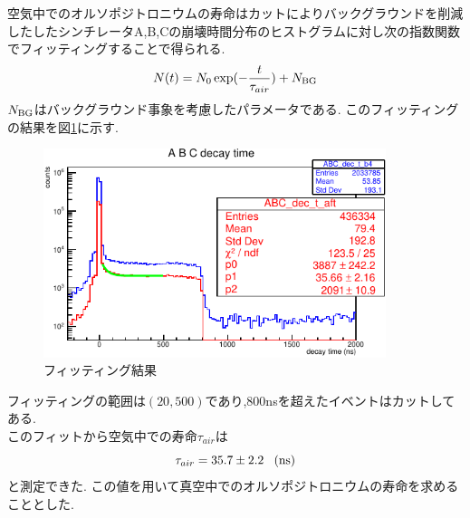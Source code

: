空気中でのオルソポジトロニウムの寿命はカットによりバックグラウンドを削減したしたシンチレータA,B,Cの崩壊時間分布のヒストグラムに対し次の指数関数でフィッティングすることで得られる.\\
\begin{equation}
N(t)=N_0\exp(-\frac{t}{\tau_{air}})+N_{\rm BG}
\end{equation}
$N_{\rm BG}$はバックグラウンド事象を考慮したパラメータである.
このフィッティングの結果を図\ref{fig:life_in_air}に示す.
\begin{figure}[htbp]
	\begin{center}
		\includegraphics[width=10cm]{fig/isb/life_air.pdf}
		\caption{フィッティング結果}
		\label{fig:life_in_air}
	\end{center}
\end{figure}
フィッティングの範囲は$(20,500)$であり,800nsを超えたイベントはカットしてある.\\
このフィットから空気中での寿命$\tau_{air}$は\\
\begin{equation}
	\tau_{air}=35.7\pm 2.2\;\;\;(\rm ns)
\end{equation}
と測定できた.
この値を用いて真空中でのオルソポジトロニウムの寿命を求めることとした.

